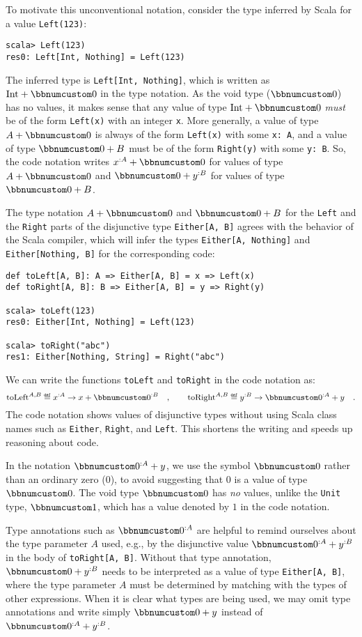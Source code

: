 To motivate this unconventional notation, consider the type inferred
by Scala for a value \lstinline!Left(123)!:
\begin{lstlisting}
scala> Left(123)
res0: Left[Int, Nothing] = Left(123)
\end{lstlisting}
The inferred type is \lstinline!Left[Int, Nothing]!, which is written
as $\text{Int}+\bbnum 0$ in the type notation. As the void type ($\bbnum 0$)
has no values, it makes sense that any value of type $\text{Int}+\bbnum 0$
\emph{must} be of the form \lstinline!Left(x)! with an integer \lstinline!x!.
More generally, a value of type $A+\bbnum 0$ is always of the form
\lstinline!Left(x)! with some \lstinline!x: A!, and a value of type
$\bbnum 0+B$ must be of the form \lstinline!Right(y)! with some
\lstinline!y: B!. So, the code notation writes $x^{:A}+\bbnum 0$
for values of type $A+\bbnum 0$ and $\bbnum 0+y^{:B}$ for values
of type $\bbnum 0+B$. 

The type notation $A+\bbnum 0$ and $\bbnum 0+B$ for the \lstinline!Left!
and the \lstinline!Right! parts of the disjunctive type \lstinline!Either[A, B]!
agrees with the behavior of the Scala compiler, which will infer the
types \lstinline!Either[A, Nothing]! and \lstinline!Either[Nothing, B]!
for the corresponding code:
\begin{lstlisting}
def toLeft[A, B]: A => Either[A, B] = x => Left(x)
def toRight[A, B]: B => Either[A, B] = y => Right(y)

scala> toLeft(123)
res0: Either[Int, Nothing] = Left(123)

scala> toRight("abc")
res1: Either[Nothing, String] = Right("abc")
\end{lstlisting}
We can write the functions \lstinline!toLeft! and \lstinline!toRight!
in the code notation as:
\[
\text{toLeft}^{A,B}\triangleq x^{:A}\rightarrow x+\bbnum 0^{:B}\quad,\quad\quad\text{toRight}^{A,B}\triangleq y^{:B}\rightarrow\bbnum 0^{:A}+y\quad.
\]
The code notation shows values of disjunctive types without using
Scala class names such as \lstinline!Either!, \lstinline!Right!,
and \lstinline!Left!. This shortens the writing and speeds up reasoning
about code. 

In the notation $\bbnum 0^{:A}+y$, we use the symbol $\bbnum 0$
rather than an ordinary zero ($0$), to avoid suggesting that $0$
is a value of type $\bbnum 0$. The void type $\bbnum 0$ has \emph{no}
values, unlike the \lstinline!Unit! type, $\bbnum 1$, which has
a value denoted by $1$ in the code notation.

Type annotations such as $\bbnum 0^{:A}$ are helpful to remind ourselves
about the type parameter $A$ used, e.g., by the disjunctive value
$\bbnum 0^{:A}+y^{:B}$ in the body of \lstinline!toRight[A, B]!.
Without that type annotation, $\bbnum 0+y^{:B}$ needs to be interpreted
as a value of type \lstinline!Either[A, B]!, where the type parameter
$A$ must be determined by matching with the types of other expressions.
When it is clear what types are being used, we may omit type annotations
and write simply $\bbnum 0+y$ instead of $\bbnum 0^{:A}+y^{:B}$.

